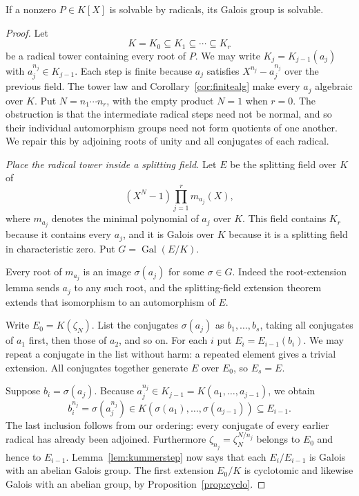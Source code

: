 \begin{theorem}[Galois]\label{thm:radsolv}
If a nonzero $P\in K[X]$ is solvable by radicals, its Galois group is solvable.
\end{theorem}
\begin{proof}
Let
\[
K=K_0\subseteq K_1\subseteq\cdots
\subseteq K_r
\]
be a radical tower containing every root of $P$.
We may write $K_j=K_{j-1}(a_j)$ with
$a_j^{n_j}\in K_{j-1}$. Each step is finite because $a_j$ satisfies
$X^{n_j}-a_j^{n_j}$ over the previous field. The tower law and
Corollary~\ref{cor:finitealg} make every $a_j$ algebraic over $K$.
Put $N=n_1\cdots n_r$, with the empty product $N=1$ when $r=0$.
The obstruction is that the intermediate
radical steps need not be normal, and so
their individual automorphism groups
need not form quotients of one another.
We repair this by adjoining roots of unity
and all conjugates of each radical.

\emph{Place the radical tower inside a splitting field.}
Let $E$ be the splitting field over $K$
of
\[
(X^N-1)\prod_{j=1}^r m_{a_j}(X),
\]
where $m_{a_j}$ denotes the minimal
polynomial of $a_j$ over $K$.
This field contains $K_r$ because it
contains every $a_j$, and it is Galois
over $K$ because it is a splitting
field in characteristic zero.
Put $G=\operatorname{Gal}(E/K)$.

Every root of $m_{a_j}$ is an image
$\sigma(a_j)$ for some $\sigma\in G$.
Indeed the root-extension lemma sends
$a_j$ to any such root, and the
splitting-field extension theorem
extends that isomorphism to an
automorphism of $E$.

Write $E_0=K(\zeta_N)$.
List the conjugates $\sigma(a_j)$
as $b_1,\ldots,b_s$, taking all
conjugates of $a_1$ first, then
those of $a_2$, and so on.
For each $i$ put $E_i=E_{i-1}(b_i)$.
We may repeat a conjugate in the
list without harm: a repeated element
gives a trivial extension.
All conjugates together generate
$E$ over $E_0$, so $E_s=E$.

Suppose $b_i=\sigma(a_j)$. Because
$a_j^{n_j}\in K_{j-1}
=K(a_1,\ldots,a_{j-1})$,
we obtain
\[
b_i^{n_j}
=\sigma(a_j^{n_j})
\in K(\sigma(a_1),\ldots,
      \sigma(a_{j-1}))
\subseteq E_{i-1}.
\]
The last inclusion follows from our
ordering: every conjugate of every
earlier radical has already been
adjoined. Furthermore
$\zeta_{n_j}=\zeta_N^{N/n_j}$
belongs to $E_0$ and hence to
$E_{i-1}$.
Lemma~\ref{lem:kummerstep} now says
that each $E_i/E_{i-1}$ is Galois
with an abelian Galois group.
The first extension $E_0/K$
is cyclotomic and likewise Galois
with an abelian group, by
Proposition~\ref{prop:cyclo}.


\end{proof}
